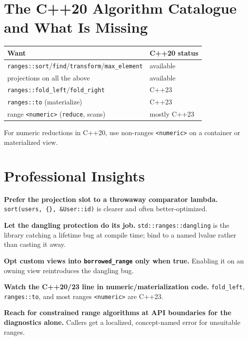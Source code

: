 \section{The C++20 Algorithm Catalogue and What Is Missing}
\label{sec:c20-algo-catalogue}

\begin{center}
\begin{tabular}{ll}
\hline
\textbf{Want} & \textbf{C++20 status} \\
\hline
\texttt{ranges::sort}/\texttt{find}/\texttt{transform}/\texttt{max\_element} & available \\
projections on all the above & available \\
\texttt{ranges::fold\_left}/\texttt{fold\_right} & C++23 \\
\texttt{ranges::to} (materialize) & C++23 \\
range \texttt{<numeric>} (\texttt{reduce}, scans) & mostly C++23 \\
\hline
\end{tabular}
\end{center}

For numeric reductions in C++20, use non-ranges \texttt{<numeric>} on a container or materialized view.

\section{Professional Insights}
\label{sec:c20-ranges-ii-insights}

\textbf{Prefer the projection slot to a throwaway comparator lambda.} \texttt{sort(users, \{\}, \&User::id)} is clearer and often better-optimized.

\textbf{Let the dangling protection do its job.} \texttt{std::ranges::dangling} is the library catching a lifetime bug at compile time; bind to a named lvalue rather than casting it away.

\textbf{Opt custom views into \texttt{borrowed\_range} only when true.} Enabling it on an owning view reintroduces the dangling bug.

\textbf{Watch the C++20/23 line in numeric/materialization code.} \texttt{fold\_left}, \texttt{ranges::to}, and most ranges \texttt{<numeric>} are C++23.

\textbf{Reach for constrained range algorithms at API boundaries for the diagnostics alone.} Callers get a localized, concept-named error for unsuitable ranges.
